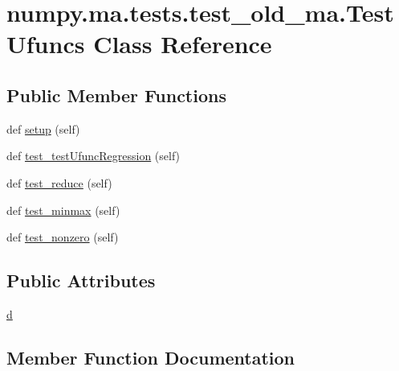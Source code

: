 \hypertarget{classnumpy_1_1ma_1_1tests_1_1test__old__ma_1_1TestUfuncs}{}\section{numpy.\+ma.\+tests.\+test\+\_\+old\+\_\+ma.\+Test\+Ufuncs Class Reference}
\label{classnumpy_1_1ma_1_1tests_1_1test__old__ma_1_1TestUfuncs}
\subsection*{Public Member Functions}
\begin{DoxyCompactItemize}
\item 
def \hyperlink{classnumpy_1_1ma_1_1tests_1_1test__old__ma_1_1TestUfuncs_ac0c82f567434ebf80998e98d7085b1d2}{setup} (self)
\item 
def \hyperlink{classnumpy_1_1ma_1_1tests_1_1test__old__ma_1_1TestUfuncs_a0a006a7a6b863bf34d996b3566a3a038}{test\+\_\+test\+Ufunc\+Regression} (self)
\item 
def \hyperlink{classnumpy_1_1ma_1_1tests_1_1test__old__ma_1_1TestUfuncs_a1b6db3144497ddcb521ea33fec1aeaff}{test\+\_\+reduce} (self)
\item 
def \hyperlink{classnumpy_1_1ma_1_1tests_1_1test__old__ma_1_1TestUfuncs_aefd1b823e6b2eb4c1c7e4e6483d5dbd6}{test\+\_\+minmax} (self)
\item 
def \hyperlink{classnumpy_1_1ma_1_1tests_1_1test__old__ma_1_1TestUfuncs_a77546730a7b3d25e070d0c72307be07b}{test\+\_\+nonzero} (self)
\end{DoxyCompactItemize}
\subsection*{Public Attributes}
\begin{DoxyCompactItemize}
\item 
\hyperlink{classnumpy_1_1ma_1_1tests_1_1test__old__ma_1_1TestUfuncs_a12f1762bfe96009df5bc97964c0f54ec}{d}
\end{DoxyCompactItemize}


\subsection{Member Function Documentation}
\mbox{\label{classnumpy_1_1ma_1_1tests_1_1test__old__ma_1_1TestUfuncs_ac0c82f567434ebf80998e98d7085b1d2}} 
